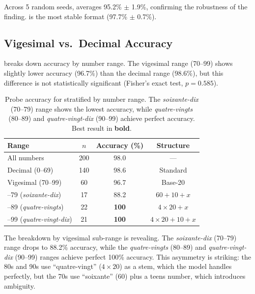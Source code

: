 Across 5 random seeds, \francefr averages 95.2\% $\pm$ 1.9\%, confirming the robustness of the finding. \belgianfr is the most stable format (97.7\% $\pm$ 0.7\%).

\subsection{Vigesimal vs.\ Decimal Accuracy}

 breaks down \francefr accuracy by number range. The vigesimal range (70--99) shows slightly lower accuracy (96.7\%) than the decimal range (98.6\%), but this difference is not statistically significant (Fisher's exact test, $p = 0.585$).

\begin{table}[t]
    \centering
    \caption{Probe accuracy for \francefr stratified by number range. The \emph{soixante-dix} (70--79) range shows the lowest accuracy, while \emph{quatre-vingts} (80--89) and \emph{quatre-vingt-dix} (90--99) achieve perfect accuracy. Best result in \textbf{bold}.}
    \begin{tabular}{@{}lccc@{}}
        \toprule
        \textbf{Range} & \textbf{$n$} & \textbf{Accuracy (\%)} & \textbf{Structure} \\
        \midrule
        All numbers         & 200 & 98.0 & --- \\
        \midrule
        Decimal (0--69)     & 140 & 98.6 & Standard \\
        Vigesimal (70--99)  & 60  & 96.7 & Base-20 \\
        \midrule
        \quad 70--79 (\emph{soixante-dix})    & 17  & 88.2 & $60+10+x$ \\
        \quad 80--89 (\emph{quatre-vingts})   & 22  & \textbf{100}  & $4\times20+x$ \\
        \quad 90--99 (\emph{quatre-vingt-dix}) & 21 & \textbf{100}  & $4\times20+10+x$ \\
        \bottomrule
    \end{tabular}
    \label{tab:vigesimal}
\end{table}

The breakdown by vigesimal sub-range is revealing. The \emph{soixante-dix} (70--79) range drops to 88.2\% accuracy, while the \emph{quatre-vingts} (80--89) and \emph{quatre-vingt-dix} (90--99) ranges achieve perfect 100\% accuracy. This asymmetry is striking: the 80s and 90s use ``quatre-vingt'' ($4\times20$) as a stem, which the model handles perfectly, but the 70s use ``soixante'' (60) plus a teens number, which introduces ambiguity.

